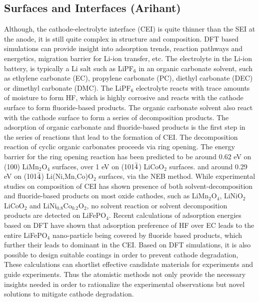 \documentclass[journal=jacsat,manuscript=article]{achemso}
\begin{document}
\subsection{Surfaces and Interfaces (Arihant)}
Although, the cathode-electrolyte interface (CEI) is quite thinner than the SEI at the anode, it is still quite complex in structure and composition.\cite{Gauthier2015, Edstrom2004} DFT based simulations can provide insight into adsorption trends,\cite{Bhandari2020} reaction pathways and energetics,\cite{Tebbe2015a, Tebbe2015b} migration barrier for Li-ion transfer,\cite{Bhandari2019} etc. The electrolyte in the Li-ion battery, is typically a Li salt such as LiPF$_6$ in an organic carbonate solvent, such as ethylene carbonate (EC), propylene carbonate (PC), diethyl carbonate (DEC) or dimethyl carbonate (DMC). The LiPF$_6$ electrolyte reacts with trace amounts of moisture to form HF,\cite{Tebbe2015a} which is highly corrosive and reacts with the cathode surface to form fluoride-based products.\cite{Tebbe2015b} The organic carbonate solvent  also react with the cathode surface to form a series of decomposition products.\cite{Tebbe2016} The adsorption of organic carbonate and fluoride-based products is the first step in the series of reactions that lead to the formation of CEI. The decomposition reaction of cyclic organic carbonates proceeds via ring opening. The energy barrier for the ring opening reaction has been predicted to be around 0.62 eV on (100) LiMn$_2$O$_4$ surfaces,\cite{Leung2012} over 1 eV on (101$\Bar{4}$) LiCoO$_2$ surfaces.\cite{Tebbe2016} and around 0.29 eV on (101$\Bar{4}$) Li(Ni,Mn,Co)O$_2$ surfaces,\cite{Xu2017} via the NEB method.\cite{JONSSON1998} While experimental studies on composition of CEI has shown presence of both solvent-decomposition and fluoride-based products on most oxide cathodes, such as LiMn$_2$O$_4$, LiNiO$_2$ LiCoO$_2$ and LiNi$_0.8$Co$_0.2$O$_2$, no solvent reaction or solvent decomposition products are detected on LiFePO$_4$.\cite{Edstrom2004, Malmgren2010} Recent calculations of adsorption energies based on DFT have shown that adsorption preference of HF over EC leads to the entire LiFePO$_4$ nano-particle being covered by fluoride based products, which further their leads to dominant in the CEI.\cite{Bhandari2020} Based on DFT simulations, it is also possible to design suitable coatings in order to prevent cathode degradation,\cite{Tebbe2015b} These calculations can shortlist effective candidate materials for experiments and guide experiments. Thus the atomistic methods not only provide the necessary insights needed in order to rationalize the experimental observations but novel solutions to mitigate cathode degradation.
\end{document}
